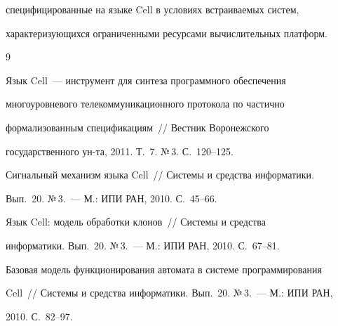 специфицированные на языке Cell в условиях встраиваемых систем, 


характеризующихся ограниченными ресурсами вычислительных платформ.





{\small\frenchspacing


{%




\begin{thebibliography}{9}


      






Язык Cell~--- инструмент для синтеза программного обеспечения 


многоуровневого телекоммуникационного протокола по частично 


формализованным спецификациям~/\!\!/ Вестник Воронежского 


государственного ун-та, 2011. Т.~7. №\,3. С.~120--125.









Сигнальный механизм языка Cell~/\!\!/ Системы и средства информатики. 


Вып.~20. №\,3.~--- М.: ИПИ РАН, 2010. С.~45--66.









Язык Cell: модель обработки клонов~/\!\!/ Системы и средства 


информатики.  Вып.~20. №\,3.~--- М.: ИПИ РАН, 2010. С.~67--81.





 \label{end\stat}









Базовая модель функционирования автомата в системе программирования 


Cell~/\!\!/ Системы и средства информатики. Вып.~20. №\,3.~--- М.: ИПИ РАН, 


2010. С.~82--97.





 \end{thebibliography}


}


}





